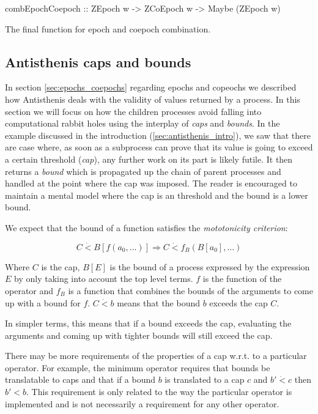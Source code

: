 \begin{code}
\begin{haskellcode}
combEpochCoepoch :: ZEpoch w -> ZCoEpoch w -> Maybe (ZEpoch w)
\end{haskellcode}
  \caption{\label{lst:comb_epoch_coepoch}The final function for epoch
    and coepoch combination.}
\end{code}

\subsection{Antisthenis caps and bounds}
\label{sec:caps_and_bounds}

In section \ref{sec:epochs_coepochs} regarding epochs and copeochs we
described how Antisthenis deals with the validity of values returned
by a process. In this section we will focus on how the children
processes avoid falling into computational rabbit holes using the
interplay of \emph{caps} and \emph{bounds}.  In the example discussed
in the introduction (\ref{sec:antisthenis_intro}), we saw that there
are case where, as soon as a subprocess can prove that its value is
going to exceed a certain threshold (\emph{cap}), any further work on
its part is likely futile. It then returns a \emph{bound} which is
propagated up the chain of parent processes and handled at the point
where the cap was imposed. The reader is encouraged to maintain a
mental model where the cap is an threshold and the bound is a lower
bound.

We expect that the bound of a function satisfies the
\emph{mototonicity criterion}:

\[
C \dot{<} B[ f(a_0, ...)] \Rightarrow C \dot{<} f_B(B[a_0],...)
\]

Where \(C\) is the cap, \(B[E]\) is the bound of a process expressed
by the expression \(E\) by only taking into account the top level
terms. \(f\) is the function of the operator and \(f_B\) is a function
that combines the bounds of the arguments to come up with a bound for
\(f\). \(C \dot{<} b\) means that the bound \(b\) exceeds the cap
\(C\).

In simpler terms, this means that if a bound exceeds the cap,
evaluating the arguments and coming up with tighter bounds will
still exceed the cap.

There may be more requirements of the properties of a cap w.r.t. to a
particular operator. For example, the minimum operator requires that
bounds be translatable to caps and that if a bound \(b\) is translated
to a cap \(c\) and \(b' \dot{<} c\) then \(b' < b\). This requirement
is only related to the way the particular operator is implemented and
is not necessarily a requirement for any other operator.


